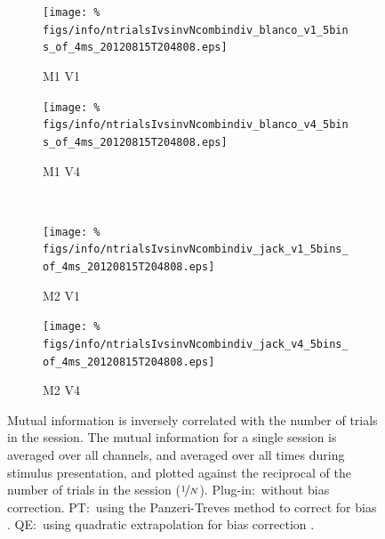 % 
% 
\begin{figure}[htbp]
    \begin{subfigure}[b]{0.5\linewidth}
        \centering
        \caption{\ac{M1} \ac{V1}}
        \label{fig:IvNb1}
        \texttt{[image: \%
figs/info/ntrialsIvsinvNcombindiv\_blanco\_v1\_5bins\_of\_4ms\_20120815T204808.eps]}
    \end{subfigure}
    \begin{subfigure}[b]{0.5\linewidth}
        \centering
        \caption{\ac{M1} \ac{V4}}
        \label{fig:IvNb4}
        \texttt{[image: \%
figs/info/ntrialsIvsinvNcombindiv\_blanco\_v4\_5bins\_of\_4ms\_20120815T204808.eps]}
    \end{subfigure}
    \\
    \begin{subfigure}[b]{0.5\linewidth}
        \centering
        \caption{\ac{M2} \ac{V1}}
        \label{fig:IvNj1}
        \texttt{[image: \%
figs/info/ntrialsIvsinvNcombindiv\_jack\_v1\_5bins\_of\_4ms\_20120815T204808.eps]}
    \end{subfigure}
    \begin{subfigure}[b]{0.5\linewidth}
        \centering
        \caption{\ac{M2} \ac{V4}}
        \label{fig:IvNj4}
        \texttt{[image: \%
figs/info/ntrialsIvsinvNcombindiv\_jack\_v4\_5bins\_of\_4ms\_20120815T204808.eps]}
    \end{subfigure}
    \caption{Mutual information is inversely correlated with the number of trials in the session. The mutual information for a single session is averaged over all channels, and averaged over all times during stimulus presentation, and plotted against the reciprocal of the number of trials in the session ($\nicefrac{1}{N}$). Plug-in:~without bias correction. \ac{PT}:~using the Panzeri-Treves method to correct for bias \citep{Panzeri1996}. \ac{QE}:~using quadratic extrapolation for bias correction \citep{Strong1998}.
}
    \label{fig:IvN}
\end{figure}

